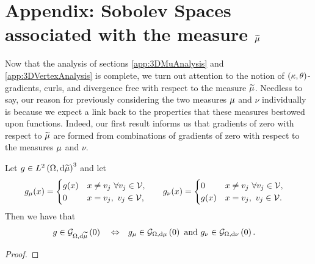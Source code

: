 \section{Appendix: Sobolev Spaces associated with the measure $\widetilde{\mu}$} \label{app:SumMeasureAnalysis}
Now that the analysis of sections \ref{app:3DMuAnalysis} and \ref{app:3DVertexAnalysis} is complete, we turn out attention to the notion of $\left( \kappa, \theta \right)$-gradients, curls, and divergence free with respect to the measure $\widetilde{\mu}$.
Needless to say, our reason for previously considering the two measures $\mu$ and $\nu$ individually is because we expect a link back to the properties that these measures bestowed upon functions.
Indeed, our first result informs us that gradients of zero with respect to $\widetilde{\mu}$ are formed from combinations of gradients of zero with respect to the measures $\mu$ and $\nu$.
\begin{prop} \label{prop:3DThickVertexGradZeroCharacterisation}
	Let $g\in L^{2}\left( \Omega,\mathrm{d}\widetilde{\mu} \right)^3$ and let 
	\begin{align*}
		g_{\mu}(x) = \begin{cases} g(x) & x\neq v_j \ \forall v_j\in\mathcal{V}, \\ 0 & x=v_j, \ v_j\in\mathcal{V}, \end{cases} 
		&\qquad
		g_{\nu}(x) = \begin{cases} 0 & x\neq v_j \ \forall v_j\in\mathcal{V}, \\ g(x) & x=v_j, \ v_j\in\mathcal{V}. \end{cases}
	\end{align*}		
	Then we have that
	\begin{align*}
		g\in\mathcal{G}_{ \Omega, \mathrm{d}\widetilde{\mu}}\left( 0 \right) \quad\Leftrightarrow\quad 
		& g_{\mu}\in\mathcal{G}_{ \Omega, \mathrm{d}\mu}\left( 0 \right) \text{ and } g_{\nu}\in\mathcal{G}_{ \Omega, \mathrm{d}\nu}\left( 0 \right).
	\end{align*}
\end{prop}
\begin{proof}
\end{proof}

